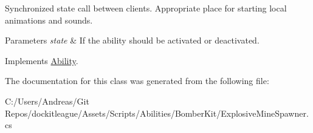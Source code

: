 Synchronized state call between clients. Appropriate place for starting local animations and sounds. 


\begin{DoxyParams}{Parameters}
{\em state} & If the ability should be activated or deactivated.\\
\hline
\end{DoxyParams}


Implements \hyperlink{class_ability_a10f7f3c2b63eeef6e352aee48d246384}{Ability}.



The documentation for this class was generated from the following file\+:\begin{DoxyCompactItemize}
\item 
C\+:/\+Users/\+Andreas/\+Git Repos/dockitleague/\+Assets/\+Scripts/\+Abilities/\+Bomber\+Kit/Explosive\+Mine\+Spawner.\+cs\end{DoxyCompactItemize}
